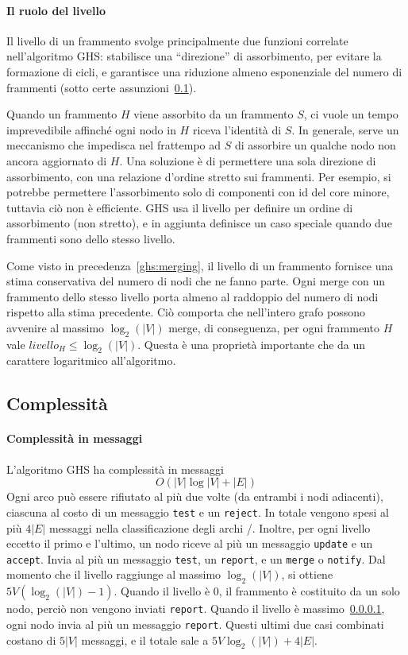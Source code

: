 \documentclass[target=bach,aauheader=,style=]{thud}
\newcommand{\eng}[1]{\foreignlanguage{english}{#1}}
\begin{document}
\paragraph{Il ruolo del livello}\label{ghs:level}
Il livello di un frammento svolge principalmente due funzioni correlate nell'algoritmo GHS: stabilisce una ``direzione'' di assorbimento, per evitare la formazione di cicli, e garantisce una riduzione almeno esponenziale del numero di frammenti (sotto certe assunzioni~\ref{ghs:complexity}).

Quando un frammento $H$ viene assorbito da un frammento $S$, ci vuole un tempo imprevedibile affinché ogni nodo in $H$ riceva l'identità di $S$. In generale, serve un meccanismo che impedisca nel frattempo ad $S$ di assorbire un qualche nodo non ancora aggiornato di $H$. Una soluzione è di permettere una sola direzione di assorbimento, con una relazione d'ordine stretto sui frammenti. Per esempio, si potrebbe permettere l'assorbimento solo di componenti con id del core minore, tuttavia ciò non è efficiente. GHS usa il livello per definire un ordine di assorbimento (non stretto), e in aggiunta definisce un caso speciale quando due frammenti sono dello stesso livello.

Come visto in precedenza~\ref{ghs:merging}, il livello di un frammento fornisce una stima conservativa del numero di nodi che ne fanno parte. Ogni \eng{merge} con un frammento dello stesso livello porta almeno al raddoppio del numero di nodi rispetto alla stima precedente. Ciò comporta che nell'intero grafo possono avvenire al massimo $\log_2(|V|)$ \eng{merge}, di conseguenza, per ogni frammento $H$ vale $livello_H\leq\log_2(|V|)$. Questa è una proprietà importante che da un carattere logaritmico all'algoritmo.

\subsection{Complessità}\label{ghs:complexity}

\paragraph{Complessità in messaggi}
L'algoritmo GHS ha complessità in messaggi
$$
O(|V|\log |V|+|E|)
$$
Ogni arco può essere rifiutato al più due volte (da entrambi i nodi adiacenti), ciascuna al costo di un messaggio \lstinline{test} e un \lstinline{reject}. In totale vengono spesi al più $4|E|$ messaggi nella classificazione degli archi \rejected/. Inoltre, per ogni livello eccetto il primo e l'ultimo, un nodo riceve al più un messaggio \lstinline{update} e un \lstinline{accept}. Invia al più un messaggio \lstinline{test}, un \lstinline{report}, e un \lstinline{merge} o \lstinline{notify}. Dal momento che il livello raggiunge al massimo $\log_2(|V|)$, si ottiene $5V(\log_2(|V|)-1)$. Quando il livello è $0$, il frammento è costituito da un solo nodo, perciò non vengono inviati \lstinline{report}. Quando il livello è massimo~\ref{ghs:level}, ogni nodo invia al più un messaggio \lstinline{report}. Questi ultimi due casi combinati costano di $5|V|$ messaggi, e il totale sale a $5V\log_2(|V|)+4|E|$.
\end{document}
